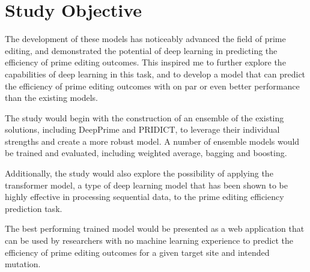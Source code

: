 \section{Study Objective}

The development of these models has noticeably advanced the field of prime editing, and demonstrated the potential of deep learning in predicting the efficiency of prime editing outcomes. This inspired me to further explore the capabilities of deep learning in this task, and to develop a model that can predict the efficiency of prime editing outcomes with on par or even better performance than the existing models.

The study would begin with the construction of an ensemble of the existing solutions, including DeepPrime and PRIDICT, to leverage their individual strengths and create a more robust model. A number of ensemble models would be trained and evaluated, including weighted average, bagging and boosting.

Additionally, the study would also explore the possibility of applying the transformer model, a type of deep learning model that has been shown to be highly effective in processing sequential data, to the prime editing efficiency prediction task. 

The best performing trained model would be presented as a web application that can be used by researchers with no machine learning experience to predict the efficiency of prime editing outcomes for a given target site and intended mutation.